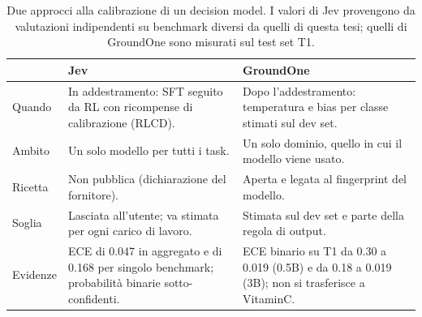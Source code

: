\begin{table}[htbp]
\centering
\caption{Due approcci alla calibrazione di un decision model. I valori di Jev provengono da valutazioni indipendenti
su benchmark diversi da quelli di questa tesi; quelli di GroundOne sono misurati sul test set T1.}
\label{tab:method-calibration-jev}
\small
\begin{tabular}{p{}p{}p{}}
\toprule
 & Jev & GroundOne \\
\midrule
Quando & In addestramento: SFT seguito da RL con ricompense di calibrazione (RLCD). & Dopo l'addestramento: temperatura e bias per classe stimati sul dev set. \\ \addlinespace
Ambito & Un solo modello per tutti i task. & Un solo dominio, quello in cui il modello viene usato. \\ \addlinespace
Ricetta & Non pubblica (dichiarazione del fornitore). & Aperta e legata al fingerprint del modello. \\ \addlinespace
Soglia & Lasciata all'utente; va stimata per ogni carico di lavoro. & Stimata sul dev set e parte della regola di output. \\ \addlinespace
Evidenze & ECE di 0.047 in aggregato e di 0.168 per singolo benchmark; probabilità binarie sotto-confidenti. & ECE binario su T1 da 0.30 a 0.019 (0.5B) e da 0.18 a 0.019 (3B); non si trasferisce a VitaminC. \\
\bottomrule
\end{tabular}
\end{table}

